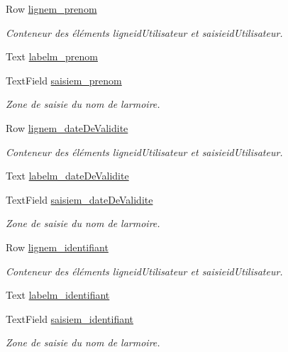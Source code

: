 \begin{DoxyCompactItemize}
Row \hyperlink{class_suppression_utilisateur_a790e5965a0bf1238a21027746d230c32}{lignem\+\_\+prenom}
\begin{DoxyCompactList}\small\item\em Conteneur des éléments ligneid\+Utilisateur et saisieid\+Utilisateur. \end{DoxyCompactList}\item 
Text \hyperlink{class_suppression_utilisateur_a03b73b6f6b6e1c28ec323d97f10cbacf}{labelm\+\_\+prenom}
\item 
Text\+Field \hyperlink{class_suppression_utilisateur_a9d1a9abc86c8dee5c3d08644c28c8408}{saisiem\+\_\+prenom}
\begin{DoxyCompactList}\small\item\em Zone de saisie du nom de l\textquotesingle{}armoire. \end{DoxyCompactList}\item 
Row \hyperlink{class_suppression_utilisateur_a1b23573048f6102509adf2ec9c6ec714}{lignem\+\_\+date\+De\+Validite}
\begin{DoxyCompactList}\small\item\em Conteneur des éléments ligneid\+Utilisateur et saisieid\+Utilisateur. \end{DoxyCompactList}\item 
Text \hyperlink{class_suppression_utilisateur_a13593d6cd4a5d62a1aca35586fd49362}{labelm\+\_\+date\+De\+Validite}
\item 
Text\+Field \hyperlink{class_suppression_utilisateur_a63e40d193c574d4d2f2f1c68f78b436b}{saisiem\+\_\+date\+De\+Validite}
\begin{DoxyCompactList}\small\item\em Zone de saisie du nom de l\textquotesingle{}armoire. \end{DoxyCompactList}\item 
Row \hyperlink{class_suppression_utilisateur_a56f2844351d2eb20fd1a5ee196dfc6b5}{lignem\+\_\+identifiant}
\begin{DoxyCompactList}\small\item\em Conteneur des éléments ligneid\+Utilisateur et saisieid\+Utilisateur. \end{DoxyCompactList}\item 
Text \hyperlink{class_suppression_utilisateur_ac10d3617cafd039f408073d1f5291522}{labelm\+\_\+identifiant}
\item 
Text\+Field \hyperlink{class_suppression_utilisateur_ac6854e2c92a4264d850ec3e898bcce42}{saisiem\+\_\+identifiant}
\begin{DoxyCompactList}\small\item\em Zone de saisie du nom de l\textquotesingle{}armoire. \end{DoxyCompactList}\item 

\end{DoxyCompactItemize}
